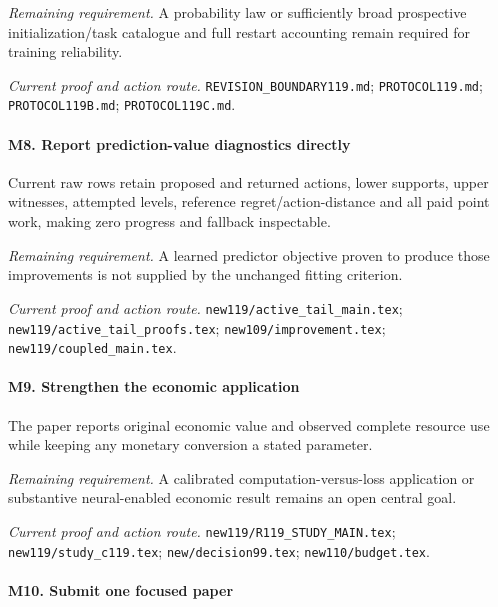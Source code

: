 \par\emph{Remaining requirement.} A probability law or sufficiently broad prospective initialization/\allowbreak{}task catalogue and full restart accounting remain required for training reliability.

\par\emph{Current proof and action route.} \nolinkurl{REVISION_BOUNDARY119.md}; \nolinkurl{PROTOCOL119.md}; \nolinkurl{PROTOCOL119B.md}; \nolinkurl{PROTOCOL119C.md}.

\paragraph{M8. Report prediction-value diagnostics directly}

Current raw rows retain proposed and returned actions, lower supports, upper witnesses, attempted levels, reference regret/\allowbreak{}action-distance and all paid point work, making zero progress and fallback inspectable.

\par\emph{Remaining requirement.} A learned predictor objective proven to produce those improvements is not supplied by the unchanged fitting criterion.

\par\emph{Current proof and action route.} \nolinkurl{new119/active_tail_main.tex}; \nolinkurl{new119/active_tail_proofs.tex}; \nolinkurl{new109/improvement.tex}; \nolinkurl{new119/coupled_main.tex}.

\paragraph{M9. Strengthen the economic application}

The paper reports original economic value and observed complete resource use while keeping any monetary conversion a stated parameter.

\par\emph{Remaining requirement.} A calibrated computation-versus-loss application or substantive neural-enabled economic result remains an open central goal.

\par\emph{Current proof and action route.} \nolinkurl{new119/R119_STUDY_MAIN.tex}; \nolinkurl{new119/study_c119.tex}; \nolinkurl{new/decision99.tex}; \nolinkurl{new110/budget.tex}.

\paragraph{M10. Submit one focused paper}

